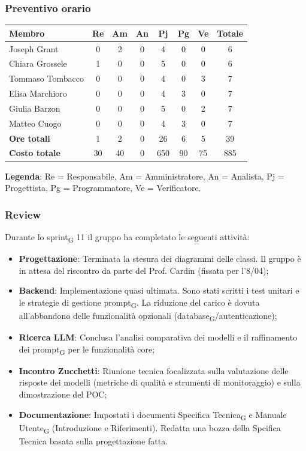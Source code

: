 \documentclass[11pt,a4paper]{article}
\newcommand{\gls}[1]{#1\textsubscript{G}}
\begin{document}
\subsubsection{Preventivo orario}
\begin{center}
    \begin{tabular}{|l|c|c|c|c|c|c|c|}
        \hline
        \textbf{Membro} & \textbf{Re} & \textbf{Am} & \textbf{An} & \textbf{Pj} & \textbf{Pg} & \textbf{Ve} & \textbf{Totale} \\
        \hline
        Joseph Grant & 0 & 2 & 0 & 4 & 0 & 0 & 6 \\
        \hline
        Chiara Grossele & 1 & 0 & 0 & 5 & 0 & 0 & 6 \\
        \hline
        Tommaso Tombacco & 0 & 0 & 0 & 4 & 0 & 3 & 7 \\
        \hline
        Elisa Marchioro & 0 & 0 & 0 & 4 & 3 & 0 & 7 \\
        \hline
        Giulia Barzon & 0 & 0 & 0 & 5 & 0 & 2 & 7 \\
        \hline
        Matteo Cuogo & 0 & 0 & 0 & 4 & 3 & 0 & 7 \\
        \hline
        \textbf{Ore totali} & 1 & 2 & 0 & 26 & 6 & 5 & 39 \\
        \hline
        \textbf{Costo totale} & 30 & 40 & 0 & 650 & 90 & 75 & 885 \\
        \hline
    \end{tabular}
\end{center}

\noindent \textbf{Legenda}: Re = Responsabile, Am = Amministratore, An = Analista, Pj = Progettista, Pg = Programmatore, Ve = Verificatore.


\subsubsection{Review}
Durante lo \gls{sprint} 11 il gruppo ha completato le seguenti attività:
\begin{itemize}
    \item \textbf{Progettazione}: Terminata la stesura dei diagrammi delle classi. Il gruppo è in attesa del riscontro da parte del Prof. Cardin (fissata per l'8/04);
    \item \textbf{Backend}: Implementazione quasi ultimata. Sono stati scritti i test unitari e le strategie di gestione \gls{prompt}. La riduzione del carico è dovuta all'abbandono delle funzionalità opzionali (\gls{database}/autenticazione);
    \item \textbf{Ricerca LLM}: Conclusa l'analisi comparativa dei modelli e il raffinamento dei \gls{prompt} per le funzionalità core;
    \item \textbf{Incontro Zucchetti}: Riunione tecnica focalizzata sulla valutazione delle risposte dei modelli (metriche di qualità e strumenti di monitoraggio) e sulla dimostrazione del POC;
    \item \textbf{Documentazione}: Impostati i documenti \gls{Specifica Tecnica} e \gls{Manuale Utente} (Introduzione e Riferimenti). Redatta una bozza della Spcifica Tecnica basata sulla progettazione fatta.
\end{itemize}
\end{document}
